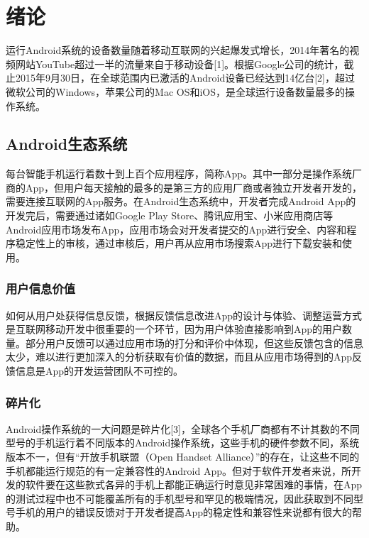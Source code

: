 
\chapter{绪论}
\label{chap:intro}

运行Android系统的设备数量随着移动互联网的兴起爆发式增长，2014年著名的视频网站YouTube超过一半的流量来自于移动设备[1]。根据Google公司的统计，截止2015年9月30日，在全球范围内已激活的Android设备已经达到14亿台[2]，超过微软公司的Windows，苹果公司的Mac OS和iOS，是全球运行设备数量最多的操作系统。

\section{Android生态系统}

每台智能手机运行着数十到上百个应用程序，简称App。其中一部分是操作系统厂商的App，但用户每天接触的最多的是第三方的应用厂商或者独立开发者开发的，需要连接互联网的App服务。在Android生态系统中，开发者完成Android App的开发完后，需要通过诸如Google Play Store、腾讯应用宝、小米应用商店等Android应用市场发布App，应用市场会对开发者提交的App进行安全、内容和程序稳定性上的审核，通过审核后，用户再从应用市场搜索App进行下载安装和使用。


\subsection{用户信息价值}

如何从用户处获得信息反馈，根据反馈信息改进App的设计与体验、调整运营方式是互联网移动开发中很重要的一个环节，因为用户体验直接影响到App的用户数量。部分用户反馈可以通过应用市场的打分和评价中体现，但这些反馈包含的信息太少，难以进行更加深入的分析获取有价值的数据，而且从应用市场得到的App反馈信息是App的开发运营团队不可控的。

\subsection{碎片化}

Android操作系统的一大问题是碎片化[3]，全球各个手机厂商都有不计其数的不同型号的手机运行着不同版本的Android操作系统，这些手机的硬件参数不同，系统版本不一，但有“开放手机联盟（Open Handset Alliance）”的存在，让这些不同的手机都能运行规范的有一定兼容性的Android App。但对于软件开发者来说，所开发的软件要在这些款式各异的手机上都能正确运行时意见非常困难的事情，在App的测试过程中也不可能覆盖所有的手机型号和罕见的极端情况，因此获取到不同型号手机的用户的错误反馈对于开发者提高App的稳定性和兼容性来说都有很大的帮助。

